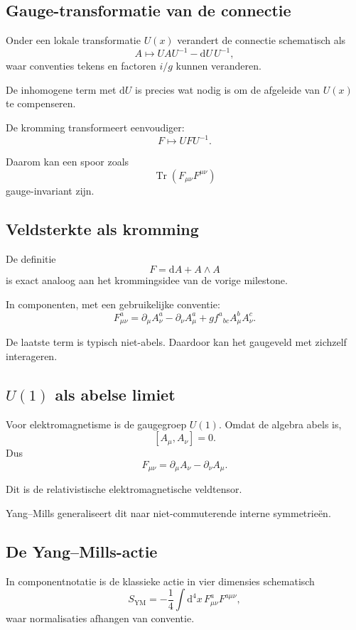 \documentclass[11pt,a4paper]{article}
\newcommand{\dd}{\mathrm{d}}
\newcommand{\Tr}{\operatorname{Tr}}
\begin{document}
\subsection{Gauge-transformatie van de connectie}

Onder een lokale transformatie $U(x)$ verandert de connectie schematisch als
\[
A\mapsto UAU^{-1}-\dd U\,U^{-1},
\]
waar conventies tekens en factoren $i/g$ kunnen veranderen.

De inhomogene term met $\dd U$ is precies wat nodig is om de afgeleide van $U(x)$ te compenseren.

De kromming transformeert eenvoudiger:
\[
F\mapsto UFU^{-1}.
\]

Daarom kan een spoor zoals
\[
\Tr(F_{\mu\nu}F^{\mu\nu})
\]
gauge-invariant zijn.

\subsection{Veldsterkte als kromming}

De definitie
\[
F=\dd A+A\wedge A
\]
is exact analoog aan het krommingsidee van de vorige milestone.

In componenten, met een gebruikelijke conventie:
\[
F^a_{\mu\nu}
=\partial_\mu A^a_\nu-\partial_\nu A^a_\mu
+g f^{a}{}_{bc}A^b_\mu A^c_\nu.
\]

De laatste term is typisch niet-abels. Daardoor kan het gaugeveld met zichzelf interageren.

\subsection{$U(1)$ als abelse limiet}

Voor elektromagnetisme is de gaugegroep $U(1)$. Omdat de algebra abels is,
\[
[A_\mu,A_\nu]=0.
\]
Dus
\[
F_{\mu\nu}=\partial_\mu A_\nu-\partial_\nu A_\mu.
\]

Dit is de relativistische elektromagnetische veldtensor.

Yang--Mills generaliseert dit naar niet-commuterende interne symmetrieën.

\subsection{De Yang--Mills-actie}

In componentnotatie is de klassieke actie in vier dimensies schematisch
\[
S_{\mathrm{YM}}=-\frac14\int \dd^4x\,F^a_{\mu\nu}F^{a\mu\nu},
\]
waar normalisaties afhangen van conventie.
\end{document}
